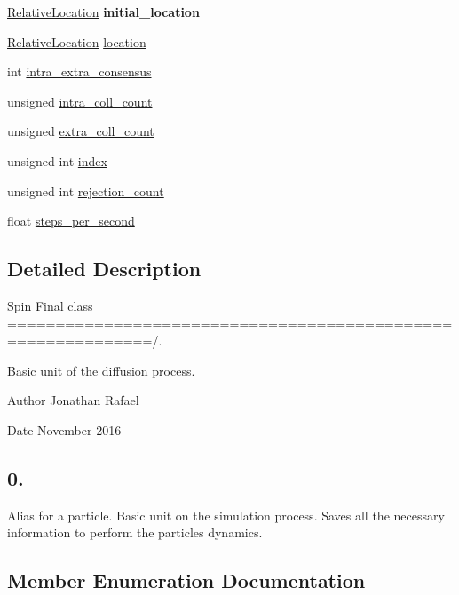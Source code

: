 \begin{DoxyCompactItemize}
\mbox{\label{class_walker_aa80fe894bc14568bdc296083ca5e5492}} 
\hyperlink{class_walker_a24246136a10754791b05cb570dbb8417}{Relative\+Location} {\bfseries initial\+\_\+location}
\item 
\hyperlink{class_walker_a24246136a10754791b05cb570dbb8417}{Relative\+Location} \hyperlink{class_walker_a77f5c801c38158bb8568f75a22baed20}{location}
\item 
int \hyperlink{class_walker_aa211ac1f9a396b1bf3b565e0f8ed098a}{intra\+\_\+extra\+\_\+consensus}
\item 
unsigned \hyperlink{class_walker_a8ca6c90f124e46869ea752920565e2c2}{intra\+\_\+coll\+\_\+count}
\item 
unsigned \hyperlink{class_walker_a28c595f6f6b4c32bed6afb177c0a6608}{extra\+\_\+coll\+\_\+count}
\item 
unsigned int \hyperlink{class_walker_a58e2d14d760748687138b7582cd04365}{index}
\item 
unsigned int \hyperlink{class_walker_a38669698192d39146c77011b69b1e372}{rejection\+\_\+count}
\item 
float \hyperlink{class_walker_a7f33d06b7aa5fabf2a2ac15d119bbcc7}{steps\+\_\+per\+\_\+second}
\end{DoxyCompactItemize}


\subsection{Detailed Description}
Spin Final class =============================================================/. 

Basic unit of the diffusion process.

\begin{DoxyAuthor}{Author}
Jonathan Rafael 
\end{DoxyAuthor}
\begin{DoxyDate}{Date}
November 2016 \subsection*{0. }
\end{DoxyDate}


Alias for a particle. Basic unit on the simulation process. Saves all the necessary information to perform the particles dynamics. 

\subsection{Member Enumeration Documentation}
\mbox{\label{class_walker_a24246136a10754791b05cb570dbb8417}} 
